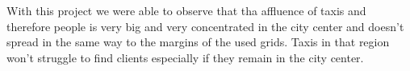 With this project we were able to observe that tha affluence of taxis and therefore people is very big and very concentrated in the city center and doesn't spread in the same way to the margins of the used grids. Taxis in that region won't struggle to find clients especially if they remain in the city center.